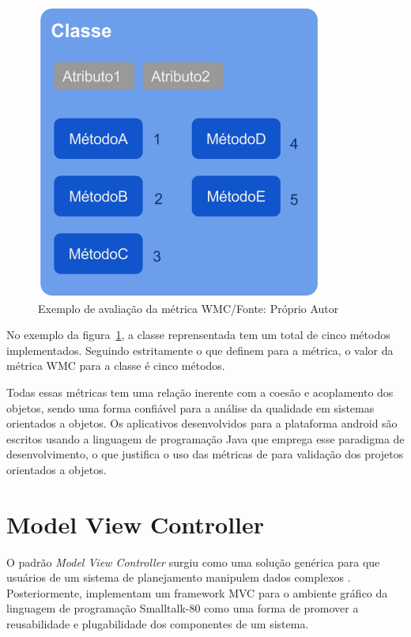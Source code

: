 \begin{description}
\begin{figure}[!ht]
	\centering
	\includegraphics[scale=0.6]{img/pic_wmc.png}
	\caption{Exemplo de avaliação da métrica WMC/Fonte: Próprio Autor}
	\label{fig:pic_wmc}
\end{figure}

No exemplo da figura~\ref{fig:pic_wmc}, a classe reprensentada tem um total de
cinco métodos implementados. Seguindo estritamente o que 
definem para a métrica, o valor da métrica WMC para a classe é cinco métodos.


\end{description}

Todas essas métricas tem uma relação inerente com a coesão e acoplamento dos
objetos, sendo uma forma confiável para a análise da qualidade em sistemas
orientados a objetos. Os aplicativos desenvolvidos para a plataforma android são
escritos usando a linguagem de programação Java que emprega esse paradigma de
desenvolvimento, o que justifica o uso das métricas de  para
validação dos projetos orientados a objetos.

\section{Model View Controller}

O padrão \textit{Model View Controller} surgiu como uma solução genérica para
que usuários de um sistema de planejamento manipulem dados complexos
. Posteriormente, 
implementam um framework MVC para o ambiente gráfico da linguagem de programação
Smalltalk-80 como uma forma de promover a reusabilidade e plugabilidade dos
componentes de um sistema.

